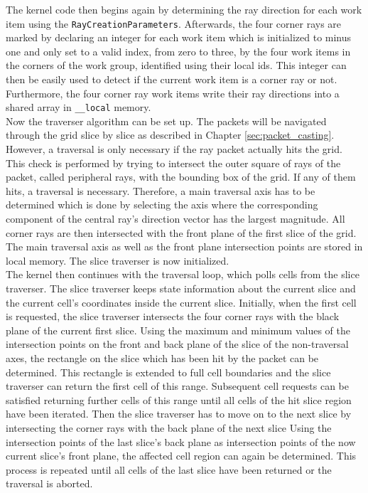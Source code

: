 The kernel code then begins again by determining the ray direction for each work item using the \lstinline!RayCreationParameters!. Afterwards, the four corner rays are marked by declaring an integer for each work item which is initialized to minus one and only set to a valid index, from zero to three, by the four work items in the corners of the work group, identified using their local ids. This integer can then be easily used to detect if the current work item is a corner ray or not. Furthermore, the four corner ray work items write their ray directions into a shared array in \lstinline!__local! memory. \\
Now the traverser algorithm can be set up. The packets will be navigated through the grid slice by slice as described in Chapter \ref{sec:packet_casting}. However, a traversal is only necessary if the ray packet actually hits the grid. This check is performed by trying to intersect the outer square of rays of the packet, called peripheral rays, with the bounding box of the grid. If any of them hits, a traversal is necessary. Therefore, a main traversal axis has to be determined which is done by selecting the axis where the corresponding component of the central ray's direction vector has the largest magnitude. All corner rays are then intersected with the front plane of the first slice of the grid. The main traversal axis as well as the front plane intersection points are stored in local memory. The slice traverser is now initialized. \\
The kernel then continues with the traversal loop, which polls cells from the slice traverser. The slice traverser keeps state information about the current slice and the current cell's coordinates inside the current slice. Initially, when the first cell is requested, the slice traverser intersects the four corner rays with the black plane of the current first slice. Using the maximum and minimum values of the intersection points on the front and back plane of the slice of the non-traversal axes, the rectangle on the slice which has been hit by the packet can be determined. This rectangle is extended to full cell boundaries and the slice traverser can return the first cell of this range. Subsequent cell requests can be satisfied returning further cells of this range until all cells of the hit slice region have been iterated. Then the slice traverser has to move on to the next slice by intersecting the corner rays with the back plane of the next slice Using the intersection points of the last slice's back plane as intersection points of the now current slice's front plane, the affected cell region can again be determined. This process is repeated until all cells of the last slice have been returned or the traversal is aborted. \\
